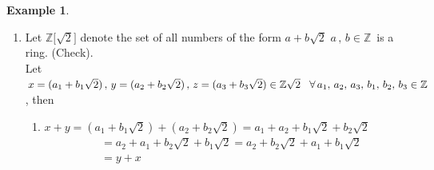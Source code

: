 \documentclass[11pt,a4paper]{article}
\theoremstyle{definition}
\newtheorem{exa}[thm]{Example}
\begin{document}
\begin{exa}
\begin{enumerate}
\begin{enumerate}
     
     \item[(iv)] $\exists\,\, -a\in \mathbb{Z}[x]\ni -a + a = -a_0 - a_1x  - \cdots\cdots - a_nx^n + a_0 + a_1x  + \cdots\cdots + a_nx^n$
     \begin{align*}
     & = a_0 + a_1x + \cdots\cdots + a_nx^n - a_0 - a_1x  - \cdots\cdots - a_nx^n\\
     & = 0\\
     & = a + (-a) = 0\\
     \end{align*}
     
     
     \item[(v)] $a(bc) = (a_0 + a_1x + \cdots\cdots + a_nx^n)\big((b_0 + b_1x  + \cdots\cdots + b_nx^n)(c_0 + c_1x  + \cdots\cdots + c_nx^n)\big)$
     \begin{align*}
     & = (a_0 + a_1x  + \cdots\cdots + a_nx^n)(b_0c_0 + b_0c_1x  + \cdots\cdots + b_0c_nx^n + b_1c_0x + b_1c_1x + \cdots\cdots)\\
     & = a_0b_0c_0 + a_0b_0c_1 x + \cdots\cdots + a_0b_0c_nx^n + a_1xb_1c_0 + a_1xb_1c_1 + \cdots\cdots\\
     & = (a_0b_0 + a_0b_1x + \cdots\cdots + a_0b_nx^n  + a_1xb_0 + a_1xb_1x + \cdots)(c_0 + c_1x + \cdots\cdots + c_nx^n)\\
     & = \big[(a_0 + a_1x + \cdots \cdot + a_nx^n)(b_0 + b_1x + \cdots\cdots + b_nx^n)\big](c_0 + c_1x + \cdots\cdots + c_n x^n)\\
     & = (ab)\cdot c\\
     \end{align*}
     
     
     
     \item[(vi)] trivial\\
\end{enumerate}




\item Let $\mathbb{Z}\big[\sqrt{2}\big]$ denote the set of all numbers of the form $a + b\sqrt{2}\, \, a\, , \, b\in \mathbb{Z}\,$ is a ring. (Check).\\

Let $\, x = (a_1 + b_1\sqrt{2})\,, \, y = (a_2 + b_2\sqrt{2})\, , \, z = (a_3 + b_3\sqrt{2})\in \mathbb{Z}\sqrt{2}\hspace{0.3cm}\forall\, a_1,\, a_2,\, a_3,\, b_1,\, b_2,\, b_3\in \mathbb{Z}$, then
\begin{enumerate}
     \item[(i)] $x + y = (a_1 + b_1\sqrt{2}) + (a_2 + b_2\sqrt{2}) = a_1 + a_2 + b_1\sqrt{2} + b_2\sqrt{2}$
     \begin{align*}
     & = a_2 + a_1 + b_2\sqrt{2} + b_1\sqrt{2} = a_2 + b_2\sqrt{2} + a_1 + b_1\sqrt{2}\\
     & = y + x\\
     \end{align*}
     

\end{enumerate}
\end{enumerate}
\end{exa}
\end{document}
